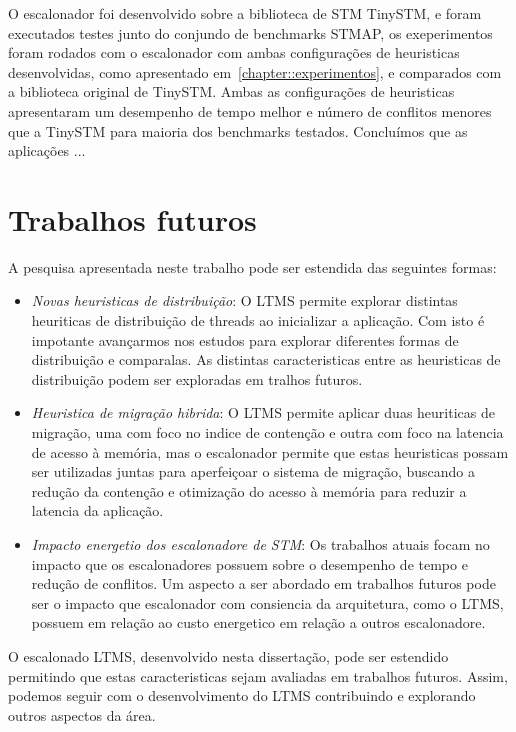 \documentclass[diss,capa]{texufpel}
\begin{document}
O escalonador foi desenvolvido sobre a biblioteca de STM TinySTM, e foram executados testes junto do conjundo de benchmarks STMAP, os exeperimentos foram rodados com o escalonador com ambas configurações de heuristicas desenvolvidas, como apresentado em~\ref{chapter::experimentos}, e comparados com a biblioteca original de TinySTM. Ambas as configurações de heuristicas apresentaram um desempenho de tempo melhor e número de conflitos menores que a TinySTM para maioria dos benchmarks testados. Concluímos que as aplicações ... 

\section{\textbf{Trabalhos futuros}}

A pesquisa apresentada neste trabalho pode ser estendida das seguintes formas:

\begin{itemize}
	\item \emph{Novas heuristicas de distribuição}: O LTMS permite explorar distintas heuriticas de distribuição de threads ao inicializar a aplicação. Com isto é impotante avançarmos nos estudos para explorar diferentes formas de distribuição e comparalas. As distintas caracteristicas entre as heuristicas de distribuição podem ser exploradas em tralhos futuros.  

	\item \emph{Heuristica de migração hibrida}: O LTMS permite aplicar duas heuriticas de migração, uma com foco no indice de contenção e outra com foco na latencia de acesso à memória, mas o escalonador permite que estas heuristicas possam ser utilizadas juntas para aperfeiçoar o sistema de migração, buscando a redução da contenção e otimização do acesso à memória para reduzir a latencia da aplicação. 

	\item \emph{Impacto energetio dos escalonadore de STM}: Os trabalhos atuais focam no impacto que os escalonadores possuem sobre o desempenho de tempo e redução de conflitos. Um aspecto a ser abordado em trabalhos futuros pode ser o impacto que escalonador com consiencia da arquitetura, como o LTMS, possuem em relação ao custo energetico em relação a outros escalonadore.
\end{itemize}

O escalonado LTMS, desenvolvido nesta dissertação, pode ser estendido permitindo que estas caracteristicas sejam avaliadas em trabalhos futuros. Assim, podemos seguir com o desenvolvimento do LTMS contribuindo e explorando outros aspectos da área.


 




\end{document}
